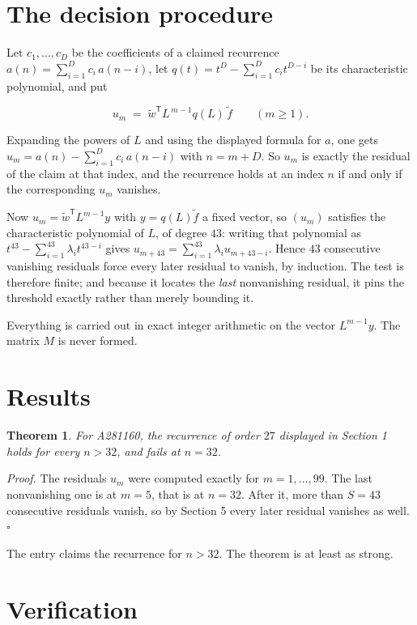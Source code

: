 \documentclass[11pt]{article}
\newtheorem{theorem}{Theorem}
\theoremstyle{definition}
\begin{document}
\section{The decision procedure}

Let $c_1,\dots,c_D$ be the coefficients of a claimed recurrence $a(n) = \sum_{i=1}^{D} c_i\,a(n-i)$, let $q(t) = t^{D} - \sum_{i=1}^{D} c_i t^{D-i}$ be its characteristic polynomial, and put

\[u_m \;=\; \tilde w^{\mathsf T} L^{\,m-1} q(L)\,\tilde f \qquad (m \ge 1).\]

Expanding the powers of $L$ and using the displayed formula for $a$, one gets $u_m = a(n) - \sum_{i=1}^{D} c_i\,a(n-i)$ with $n = m + D$. So $u_m$ is exactly the residual of the claim at that index, and the recurrence holds at an index $n$ if and only if the corresponding $u_m$ vanishes.

Now $u_m = \tilde w^{\mathsf T} L^{m-1} y$ with $y = q(L)\tilde f$ a fixed vector, so $(u_m)$ satisfies the characteristic polynomial of $L$, of degree $43$: writing that polynomial as $t^{43} - \sum_{i=1}^{43} \lambda_i t^{43-i}$ gives $u_{m+43} = \sum_{i=1}^{43} \lambda_i u_{m+43-i}$. Hence $43$ consecutive vanishing residuals force every later residual to vanish, by induction. The test is therefore finite; and because it locates the {\itshape last} nonvanishing residual, it pins the threshold exactly rather than merely bounding it.

Everything is carried out in exact integer arithmetic on the vector $L^{m-1}y$. The matrix $M$ is never formed.

\section{Results}

\begin{theorem} For A281160, the recurrence of order $27$ displayed in Section 1 holds for every $n > 32$, and fails at $n = 32$.\end{theorem}

{\itshape Proof.} The residuals $u_m$ were computed exactly for $m = 1,\dots,99$. The last nonvanishing one is at $m = 5$, that is at $n = 32$. After it, more than $S = 43$ consecutive residuals vanish, so by Section 5 every later residual vanishes as well. $\square$

The entry claims the recurrence for $n > 32$. The theorem is at least as strong.

\section{Verification}
\end{document}
